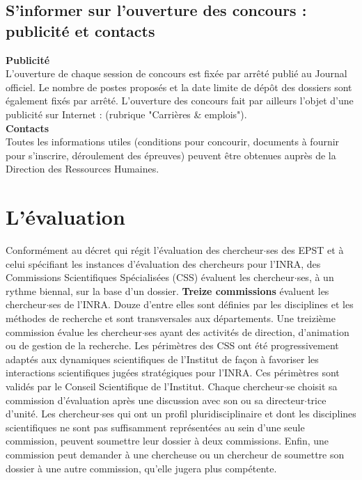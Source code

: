\subsection{ S'informer sur l'ouverture des concours : publicit\'e et contacts}

{\bf Publicit\'e}\\
L'ouverture de chaque session de concours est fix\'ee par arr\^et\'e publi\'e au Journal officiel. Le nombre de postes propos\'es et la date limite de d\'ep\^ot des dossiers sont \'egalement fix\'es par arr\^et\'e. L'ouverture des concours fait par ailleurs l'objet d'une publicit\'e sur Internet : (rubrique "Carri\`eres \& emplois").\\

{\bf Contacts}\\
Toutes les informations utiles (conditions pour concourir, documents \`a fournir pour s'inscrire, d\'eroulement des \'epreuves) peuvent \^etre obtenues aupr\`es de la Direction des Ressources Humaines.

\section{L'\'evaluation}
Conform\'ement au d\'ecret qui r\'egit l'\'evaluation des chercheur$\cdot$ses des EPST et \`a celui sp\'ecifiant les instances d'\'evaluation des chercheurs pour l'INRA, des Commissions Scientifiques Sp\'ecialis\'ees (CSS) \'evaluent les chercheur$\cdot$ses, \`a un rythme biennal, sur la base d'un dossier. {\bf Treize commissions} \'evaluent les chercheur$\cdot$ses de l'INRA. Douze d'entre elles sont d\'efinies par les disciplines et les m\'ethodes de recherche et sont transversales aux d\'epartements. Une treizi\`eme commission \'evalue les chercheur$\cdot$ses ayant des activit\'es de direction, d'animation ou de gestion de la recherche. Les p\'erim\`etres des CSS ont \'et\'e progressivement adapt\'es aux dynamiques scientifiques de l'Institut de fa\c{c}on \`a favoriser les interactions scientifiques jug\'ees strat\'egiques pour l'INRA. Ces p\'erim\`etres sont valid\'es par le Conseil Scientifique de l'Institut. Chaque chercheur$\cdot$se choisit sa commission d'\'evaluation apr\`es une discussion avec son ou sa directeur$\cdot$trice d'unit\'e. Les chercheur$\cdot$ses qui ont un profil pluridisciplinaire et dont les disciplines scientifiques ne sont pas suffisamment repr\'esent\'ees au sein d'une seule commission, peuvent soumettre leur dossier \`a deux commissions. Enfin, une commission peut demander \`a une chercheuse ou un chercheur  de soumettre son dossier \`a une autre commission, qu'elle jugera plus comp\'etente.\\

